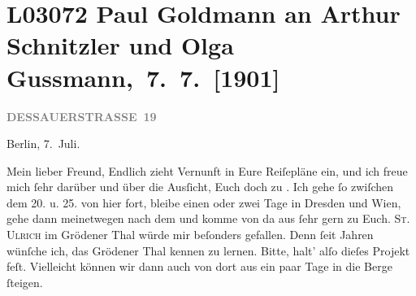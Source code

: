 

\section[ Paul Goldmann an Arthur Schnitzler und Olga Gussmann, 7. 7. {[}1901{]}]{L03072 Paul Goldmann an Arthur Schnitzler und Olga
               Gussmann, 7. 7. {[}1901{]}}
\nopagebreak{}
\rehead{ }\normalsize\beginnumbering{}
\toendnotes[C]{\smallbreak\pagebreak[2]}
\toendnotes[C]{\smallbreak}
\pstart
           \raggedleft{}{\pb}\textcolor{gray}{\textbf{DESSAUERSTRASSE 19}}\pend
           
\pstart
           Berlin, 7. Juli.\pend
           
\pstart\center{}Mein lieber Freund,\pend\vspace{0.5em}
\pstart
           Endlich zieht Vernunft in Eure Reiſepläne ein, und ich freue mich ſehr darüber und
               über die Ausſicht, Euch doch zu \label{K_L03072-1v}\label{K_L03072-1}. Ich gehe ſo zwiſchen dem 20. u. 25. von hier fort, bleibe einen oder zwei Tage in Dresden und Wien, gehe dann meinetwegen nach dem \label{K_L03072-2v}\label{K_L03072-2} und komme von da aus ſehr gern zu Euch. \textsc{St. Ulrich} im {\pb}Grödener Thal würde mir beſonders gefallen.
               Denn ſeit Jahren wünſche ich, das Grödener Thal
               kennen zu lernen. Bitte, halt’ alſo dieſes Projekt feſt. Vielleicht können wir dann
               auch von dort aus ein paar Tage in die Berge ſteigen.\pend
           
